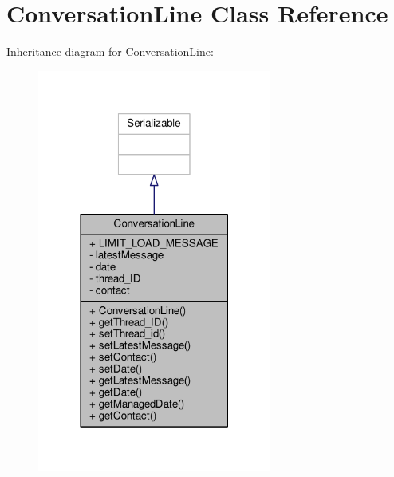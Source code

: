 \hypertarget{a00009}{\section{Conversation\+Line Class Reference}
\label{a00009}
}


Inheritance diagram for Conversation\+Line\+:
\nopagebreak
\begin{figure}[H]
\begin{center}
\leavevmode
\includegraphics[width=218pt]{a00064}
\end{center}
\end{figure}


